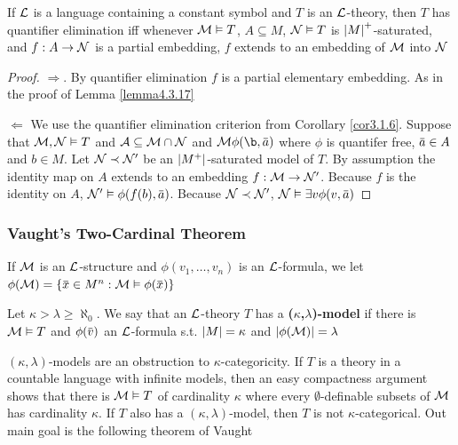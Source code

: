 \documentclass[11pt]{article}
\begin{document}
\begin{proposition}[]
If \(\mathcal{L}\) is a language containing a constant symbol and \(T\) is an \(\mathcal{L}\)-theory, then \(T\) has
quantifier elimination iff whenever \(\mathcal{M}\vDash T\), \(A\subseteq M\), \(\mathcal{N}\vDash T\) is \(\abs{M}^+\)-saturated,
and \(f:A\to\mathcal{N}\)  is a partial embedding, \(f\) extends to an embedding of \(\mathcal{M}\) into \(\mathcal{N}\)
\end{proposition}

\begin{proof}
\(\Rightarrow\). By quantifier elimination \(f\) is a partial elementary embedding. As in the proof of Lemma
\ref{lemma4.3.17}

\(\Leftarrow\) We use the quantifier elimination criterion from Corollary \ref{cor3.1.6}. Suppose
that \(\mathcal{M},\mathcal{N}\vDash T\) and \(\mathcal{A}\subseteq\mathcal{M}\cap\mathcal{N}\) and \(\calm\phi(\b,\bara)\) where \(\phi\) is quantifer free, \(\bara\in A\)
and \(b\in M\). Let \(\mathcal{N}\prec\mathcal{N}'\) be an \(\abs{M^+}\)-saturated model of \(T\). By assumption the
identity map on \(A\) extends to an embedding \(f:\mathcal{M}\to\mathcal{N}'\). Because \(f\) is the identity
on \(A\), \(\caln'\vDash\phi(f(b),\bara)\). Because \(\mathcal{N}\prec\mathcal{N}'\), \(\caln\vDash\exists v\phi(v,\bara)\)
\end{proof}


\subsubsection{Vaught's Two-Cardinal Theorem}
\label{sec:org61e87b9}

If \(\mathcal{M}\) is an \(\mathcal{L}\)-structure and \(\phi(v_1,\dots,v_n)\) is an \(\mathcal{L}\)-formula, we
let \(\phi(\calm)=\{\barx\in M^n:\calm\vDash\phi(\barx)\}\)

\begin{definition}[]
Let \(\kappa>\lambda\ge\aleph_0\). We say that an \(\mathcal{L}\)-theory \(T\) has a \textbf{(\(\kappa\),\(\lambda\))-model} if there
is \(\mathcal{M}\vDash T\) and \(\phi(\barv)\) an \(\mathcal{L}\)-formula s.t. \(\abs{M}=\kappa\) and \(\abs{\phi(\calm)}=\lambda\)
\end{definition}

\((\kappa,\lambda)\)-models are an obstruction to \(\kappa\)-categoricity. If \(T\) is a theory in a countable
language with infinite models, then an easy compactness argument shows that there is \(\mathcal{M}\vDash T\) of
cardinality \(\kappa\) where every \(\emptyset\)-definable subsets of \(\mathcal{M}\) has cardinality \(\kappa\).
If \(T\) also has a \((\kappa,\lambda)\)-model,
then \(T\) is not \(\kappa\)-categorical. Out main goal is the following theorem of Vaught
\end{document}
